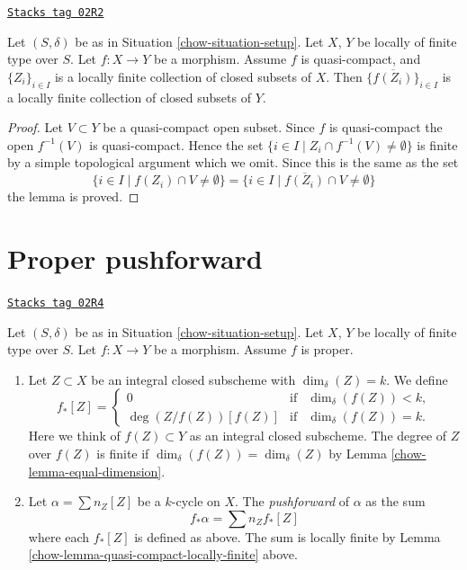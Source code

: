 \begin{lemma}
\label{chow-lemma-quasi-compact-locally-finite}
\href{https://stacks.math.columbia.edu/tag/02R2}{\texttt{Stacks tag 02R2}}

Let $(S, \delta)$ be as in Situation \ref{chow-situation-setup}.
Let $X$, $Y$ be locally of finite type over $S$.
Let $f : X \to Y$ be a morphism.
Assume $f$ is quasi-compact, and $\{Z_i\}_{i \in I}$ is a locally
finite collection of closed subsets of $X$.
Then $\{\overline{f(Z_i)}\}_{i \in I}$ is a locally finite
collection of closed subsets of $Y$.
\end{lemma}

\begin{proof}
Let $V \subset Y$ be a quasi-compact open subset.
Since $f$ is quasi-compact the open $f^{-1}(V)$ is
quasi-compact. Hence the set
$\{i \in I \mid Z_i \cap f^{-1}(V) \not = \emptyset \}$
is finite by a simple topological argument which we omit.
Since this is the same as the set
$$
\{i \in I \mid f(Z_i) \cap V \not = \emptyset \} =
\{i \in I \mid \overline{f(Z_i)} \cap V \not = \emptyset \}
$$
the lemma is proved.
\end{proof}

\section{Proper pushforward}
\label{chow-section-proper-pushforward}
\begin{definition}
\label{chow-definition-proper-pushforward}
\href{https://stacks.math.columbia.edu/tag/02R4}{\texttt{Stacks tag 02R4}}

Let $(S, \delta)$ be as in Situation \ref{chow-situation-setup}.
Let $X$, $Y$ be locally of finite type over $S$.
Let $f : X \to Y$ be a morphism.
Assume $f$ is proper.
\begin{enumerate}
\item Let $Z \subset X$ be an integral closed subscheme
with $\dim_\delta(Z) = k$. We define
$$
f_*[Z] =
\left\{
\begin{matrix}
0 & \text{if} & \dim_\delta(f(Z))< k, \\
\deg(Z/f(Z)) [f(Z)] & \text{if} & \dim_\delta(f(Z)) = k.
\end{matrix}
\right.
$$
Here we think of $f(Z) \subset Y$ as an integral closed subscheme.
The degree of $Z$ over $f(Z)$ is finite if
$\dim_\delta(f(Z)) = \dim_\delta(Z)$
by Lemma \ref{chow-lemma-equal-dimension}.
\item Let $\alpha = \sum n_Z [Z]$ be a $k$-cycle on $X$. The
{\it pushforward} of $\alpha$ as the sum
$$
f_* \alpha = \sum n_Z f_*[Z]
$$
where each $f_*[Z]$ is defined as above. The sum is locally finite
by Lemma \ref{chow-lemma-quasi-compact-locally-finite} above.
\end{enumerate}
\end{definition}

